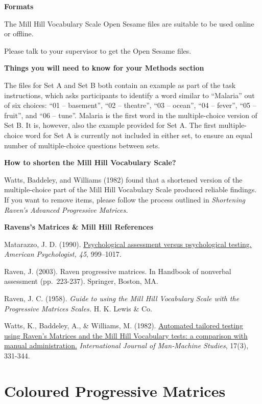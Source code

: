 \documentclass[
]{book}
\begin{document}
\textbf{Formats}

The Mill Hill Vocabulary Scale Open Sesame files are suitable to be used online or offline.

Please talk to your supervisor to get the Open Sesame files.

\textbf{Things you will need to know for your Methods section}

The files for Set A and Set B both contain an example as part of the task instructions, which asks participants to identify a word similar to ``Malaria'' out of six choices: ``01 -- basement'', ``02 -- theatre'', ``03 -- ocean'', ``04 -- fever'', ``05 -- fruit'', and ``06 -- tune''. Malaria is the first word in the multiple-choice version of Set B. It is, however, also the example provided for Set A. The first multiple-choice word for Set A is currently not included in either set, to ensure an equal number of multiple-choice questions between sets.

\textbf{How to shorten the Mill Hill Vocabulary Scale?}

Watts, Baddeley, and Williams (1982) found that a shortened version of the multiple-choice part of the Mill Hill Vocabulary Scale produced reliable findings. If you want to remove items, please follow the process outlined in \emph{Shortening Raven's Advanced Progressive Matrices.}

\textbf{Ravens's Matrices \& Mill Hill References}

Matarazzo, J. D. (1990). \href{https://www.gwern.net/docs/psychology/1990-matarazzo.pdf}{Psychological assessment versus psychological testing.} \emph{American Psychologist, 45}, 999--1017.

Raven, J. (2003). Raven progressive matrices. In Handbook of nonverbal assessment (pp.~223-237). Springer, Boston, MA.

Raven, J. C. (1958). \emph{Guide to using the Mill Hill Vocabulary Scale with the Progressive Matrices Scales.} H. K. Lewis \& Co.

Watts, K., Baddeley, A., \& Williams, M. (1982). \href{https://www.sciencedirect.com/science/article/abs/pii/S0020737382800357}{Automated tailored testing using Raven's Matrices and the Mill Hill Vocabulary tests: a comparison with manual administration.} \emph{International Journal of Man-Machine Studies}, 17(3), 331-344.

\hypertarget{coloured-progressive-matrices}{%
\section{Coloured Progressive Matrices}\label{coloured-progressive-matrices}}
\end{document}
